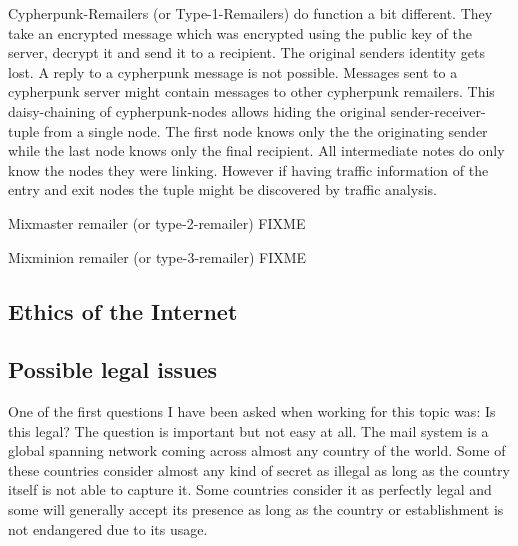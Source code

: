 Cypherpunk-Remailers (or Type-1-Remailers) do function a bit different. They take an encrypted message which was encrypted using the public key of the server, decrypt it and send it to a recipient. The original senders identity gets lost. A reply to a cypherpunk message is not possible. Messages sent to a cypherpunk server might contain messages to other cypherpunk remailers. This daisy-chaining of cypherpunk-nodes allows hiding the original sender-receiver-tuple from a single node. The first node knows only the the originating sender while the last node knows only the final recipient. All intermediate notes do only know the nodes they were linking. However if having traffic information of the entry and exit nodes the tuple might be discovered by traffic analysis.\par

Mixmaster remailer (or type-2-remailer) FIXME

Mixminion remailer (or type-3-remailer) FIXME


\subsection{Ethics of the Internet}
\cite[p.~1]{RFC1087}

\subsection{Possible legal issues}
One of the first questions I have been asked when working for this topic was: Is this legal? The question is important but not easy at all. The mail system is a global spanning network coming across almost any country of the world. Some of these countries consider almost any kind of secret as illegal as long as the country itself is not able to capture it. Some countries consider it as perfectly legal and some will generally accept its presence as long as the country or establishment is not endangered due to its usage. \par


